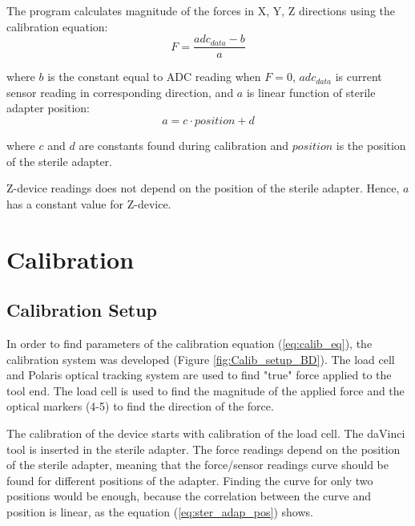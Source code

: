 The program calculates magnitude of the forces in X, Y, Z directions using the calibration equation:
\begin{equation}\label{eq:calib_eq}
F = \frac{adc_{data} - b}{a}
\end{equation}

where $b$ is the constant equal to ADC reading when $F = 0$, $adc_{data}$ is current sensor reading in corresponding direction, and $a$ is linear function of sterile adapter position:
\begin{equation}\label{eq:ster_adap_pos}
a = c \cdot position + d
\end{equation}

where $c$ and $d$ are constants found during calibration and $position$ is the position of the sterile adapter.

Z-device readings does not depend on the position of the sterile adapter. Hence, $a$ has a constant value for Z-device.
 
	
\section{Calibration}
\label{section:Calibration}

	\subsection{Calibration Setup}
	\label{sec:CalSetup}
	In order to find parameters of the calibration equation (\ref{eq:calib_eq}), the calibration system was developed (Figure \ref{fig:Calib_setup_BD}). The load cell and Polaris optical tracking system are used to find "true" force applied to the tool end. The load cell is used to find the magnitude of the applied force and the optical markers (4-5) to find the direction of the force.
	
	The calibration of the device starts with calibration of the load cell. The daVinci tool is inserted in the sterile adapter.  The force readings depend on the position of the sterile adapter, meaning that the force/sensor readings curve should be found for different positions of the adapter. Finding the curve for only two positions would be enough, because the correlation between the curve and position is linear, as the equation (\ref{eq:ster_adap_pos}) shows. 
	
